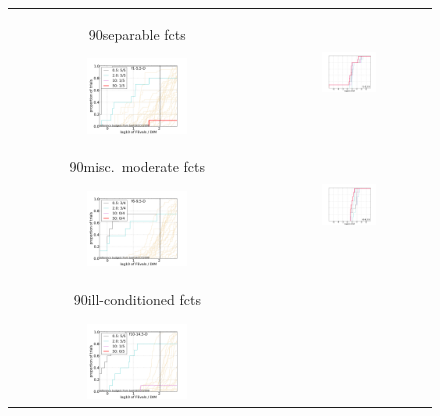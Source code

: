 \documentclass{article}
\newcommand{\rot}[2][2.5]{
  \hspace*{-3.5\baselineskip}%
  \begin{rotate}{90}\hspace{#1em}#2
  \end{rotate}}
\begin{document}
\begin{figure}[htbp!]
\centering
\begin{tabular}{@{}c@{}c@{}}
\rot[2.5]{separable fcts}
\includegraphics[width=0.41\textwidth,trim=0 7.5mm 16mm 11mm, clip]{pprldistr_05D_separ} &
\includegraphics[width=0.3579\textwidth,trim=24mm 7.5mm 16mm 11mm, clip]{ppfvdistr_05D_separ}
\\[-1ex]
\rot[1.3]{misc.\ moderate fcts}
\includegraphics[width=0.41\textwidth,trim=0 7.5mm 16mm 11mm, clip]{pprldistr_05D_lcond} &
\includegraphics[width=0.3579\textwidth,trim=24mm 7.5mm 16mm 11mm, clip]{ppfvdistr_05D_lcond}
\\[-1ex]
\rot[1.1]{ill-conditioned fcts}
\includegraphics[width=0.41\textwidth,trim=0 7.5mm 16mm 11mm, clip]{pprldistr_05D_hcond} &

\end{tabular}
\end{figure}
\end{document}
